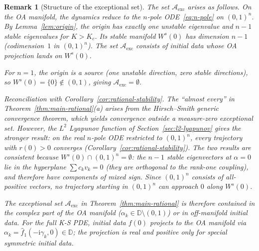 \documentclass[11pt,a4paper]{article}
\newtheorem{remark}[theorem]{Remark}
\theoremstyle{definition}
\newcommand{\D}{\mathbb{D}}
\begin{document}
\begin{remark}[Structure of the exceptional set]\label{rem:exceptional}
The set $\mathcal{A}_{\mathrm{exc}}$ arises as follows. On the OA manifold, the dynamics reduce to the $n$-pole ODE~\eqref{eq:n-pole} on $(0,1)^n$. By Lemma~\ref{lem:origin}, the origin has exactly one unstable eigenvalue and $n-1$ stable eigenvalues for $K > K_c$. Its stable manifold $W^s(0)$ has dimension $n-1$ (codimension~$1$ in $(0,1)^n$). The set $\mathcal{A}_{\mathrm{exc}}$ consists of initial data whose OA projection lands on $W^s(0)$.

For $n = 1$, the origin is a source (one unstable direction, zero stable directions), so $W^s(0) = \{0\} \notin (0,1)$, giving $\mathcal{A}_{\mathrm{exc}} = \emptyset$.

\emph{Reconciliation with Corollary~\ref{cor:rational-stability}.} The ``almost every'' in Theorem~\ref{thm:main-rational}(a) arises from the Hirsch--Smith generic convergence theorem, which yields convergence outside a measure-zero exceptional set. However, the $L^2$ Lyapunov function of Section~\ref{sec:l2-lyapunov} gives the \emph{stronger} result: on the real $n$-pole ODE restricted to $(0,1)^n$, \emph{every} trajectory with $r(0) > 0$ converges (Corollary~\ref{cor:rational-stability}). The two results are consistent because $W^s(0) \cap (0,1)^n = \emptyset$: the $n-1$ stable eigenvectors at $\alpha = 0$ lie in the hyperplane $\sum c_k v_k = 0$ (they are orthogonal to the rank-one coupling), and therefore have components of mixed sign. Since $(0,1)^n$ consists of all-positive vectors, no trajectory starting in $(0,1)^n$ can approach $0$ along $W^s(0)$.

The exceptional set $\mathcal{A}_{\mathrm{exc}}$ in Theorem~\ref{thm:main-rational} is therefore contained in the \emph{complex} part of the OA manifold ($\alpha_k \in \D \setminus (0,1)$) or in off-manifold initial data. For the full K-S PDE, initial data $f(0)$ projects to the OA manifold via $\alpha_k = \hat{f}_1(-\mathrm{i}\gamma_k, 0) \in \D$; the projection is real and positive only for special symmetric initial data.
\end{remark}
\end{document}
